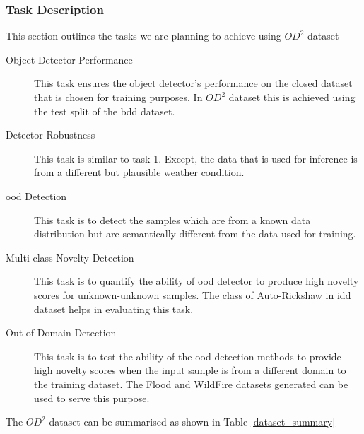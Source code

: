     \subsubsection{Task Description}
    This section outlines the tasks we are planning to achieve using $OD^2$ dataset
    \begin{description}
        \item[Object Detector Performance] This task ensures the object detector's performance on the closed dataset that is chosen for training purposes. In $OD^2$ dataset this is achieved using the test split of the \acrshort{bdd} dataset.
        \item[Detector Robustness] This task is similar to task 1. Except, the data that is used for inference is from a different but plausible weather condition.
        \item[\acrshort{ood} Detection] This task is to detect the samples which are from a known data distribution but are semantically different from the data used for training.
        \item[Multi-class Novelty Detection] This task is to quantify the ability of \acrshort{ood} detector to produce high novelty scores for unknown-unknown samples. The class of Auto-Rickshaw in \acrshort{idd} dataset helps in evaluating this task.
        \item[Out-of-Domain Detection] This task is to test the ability of the \acrshort{ood} detection methods to provide high novelty scores when the input sample is from a different domain to the training dataset. The Flood and WildFire datasets generated can be used to serve this purpose.
    \end{description}
    
    The $OD^{2}$ dataset can be summarised as shown in Table \ref{dataset_summary}
    
